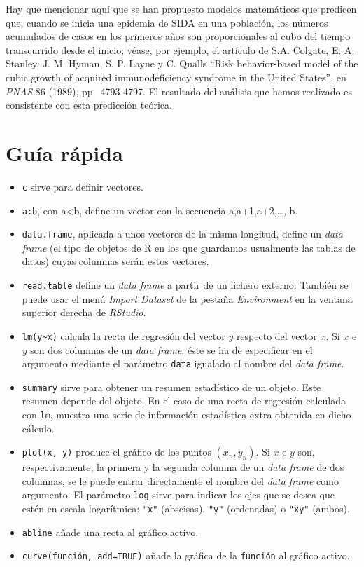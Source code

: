 \documentclass[]{book}
\providecommand{\tightlist}{%
  \setlength{\itemsep}{0pt}\setlength{\parskip}{0pt}}
\theoremstyle{definition}
\theoremstyle{definition}
\theoremstyle{definition}
\theoremstyle{remark}
\begin{document}
Hay que mencionar aquí que se han propuesto modelos matemáticos que predicen que, cuando se inicia una epidemia de SIDA en una población, los números acumulados de casos en los primeros años son proporcionales al cubo del tiempo transcurrido desde el inicio; véase, por ejemplo, el artículo de S.A. Colgate, E. A. Stanley, J. M. Hyman, S. P. Layne y C. Qualls ``Risk behavior-based model of the cubic growth of acquired immunodeficiency syndrome in the United States'', en \emph{PNAS} 86 (1989), pp.~4793-4797. El resultado del análisis que hemos realizado es consistente con esta predicción teórica.

\hypertarget{guia-rapida-2}{%
\section{Guía rápida}\label{guia-rapida-2}}

\begin{itemize}
\tightlist
\item
  \texttt{c} sirve para definir vectores.
\item
  \texttt{a:b}, con a\textless{}b, define un vector con la secuencia a,a+1,a+2,\ldots{}, b.
\item
  \texttt{data.frame}, aplicada a unos vectores de la misma longitud, define un \emph{data frame} (el tipo de objetos de R en los que guardamos usualmente las tablas de datos) cuyas columnas serán estos vectores.
\item
  \texttt{read.table} define un \emph{data frame} a partir de un fichero externo. También se puede usar el menú \emph{Import Dataset} de la pestaña \emph{Environment} en la ventana superior derecha de \emph{RStudio}.
\item
  \texttt{lm(y\textasciitilde{}x)} calcula la recta de regresión del vector \(y\) respecto del vector \(x\). Si \(x\) e \(y\) son dos columnas de un \emph{data frame}, éste se ha de especificar en el argumento mediante el parámetro \texttt{data} igualado al nombre del \emph{data frame}.
\item
  \texttt{summary} sirve para obtener un resumen estadístico de un objeto. Este resumen depende del objeto. En el caso de una recta de regresión calculada con \texttt{lm}, muestra una serie de información estadística extra obtenida en dicho cálculo.
\item
  \texttt{plot(x,\ y)} produce el gráfico de los puntos \((x_n,y_n)\). Si \(x\) e \(y\) son, respectivamente, la primera y la segunda columna de un \emph{data frame} de dos columnas, se le puede entrar directamente el nombre del \emph{data frame} como argumento. El parámetro \texttt{log} sirve para indicar los ejes que se desea que estén en escala logarítmica: \texttt{"x"} (abscisas),
  \texttt{"y"} (ordenadas) o \texttt{"xy"} (ambos).
\item
  \texttt{abline} añade una recta al gráfico activo.
\item
  \texttt{curve(función,\ add=TRUE)} añade la gráfica de la \texttt{función} al gráfico activo.
\end{itemize}
\end{document}
